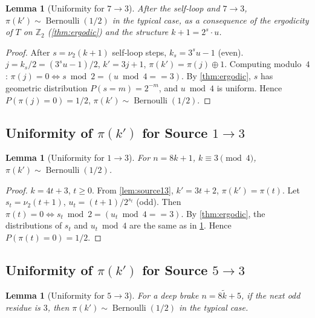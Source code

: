 \documentclass[12pt,a4paper]{article}
\newtheorem{lemma}[theorem]{Lemma}
\theoremstyle{definition}
\theoremstyle{remark}
\begin{document}
\begin{lemma}[Uniformity for $7\to3$]\label{lem:unif73}
After the self‑loop and $7\to3$, $\pi(k')\sim\operatorname{Bernoulli}(1/2)$
in the typical case, as a consequence of the ergodicity of $T$ on
$\mathbb Z_2$ (\cref{thm:ergodic}) and the structure
$k+1=2^s\!\cdot u$.
\end{lemma}

\begin{proof}
After $s=\nu_2(k+1)$ self‑loop steps, $k_s=3^su-1$ (even).
$j=k_s/2=(3^su-1)/2$, $k'=3j+1$, $\pi(k')=\pi(j)\oplus1$.
Computing modulo~$4$:
$\pi(j)=0\iff s\bmod2=(u\bmod4==3)$.
By \cref{thm:ergodic}, $s$ has geometric distribution
$P(s=m)=2^{-m}$, and $u\bmod4$ is uniform.
Hence $P(\pi(j)=0)=1/2$, $\pi(k')\sim\operatorname{Bernoulli}(1/2)$.
\end{proof}

\subsection{Uniformity of $\pi(k')$ for Source $1\to3$}

\begin{lemma}[Uniformity for $1\to3$]\label{lem:unif13}
For $n=8k+1$, $k\equiv3\pmod4$, $\pi(k')\sim\operatorname{Bernoulli}(1/2)$.
\end{lemma}

\begin{proof}
$k=4t+3$, $t\ge0$. From \cref{lem:source13}, $k'=3t+2$,
$\pi(k')=\pi(t)$.
Let $s_t=\nu_2(t+1)$, $u_t=(t+1)/2^{s_t}$ (odd).
Then $\pi(t)=0\iff s_t\bmod2=(u_t\bmod4==3)$.
By \cref{thm:ergodic}, the distributions of $s_t$ and $u_t\bmod4$ are
the same as in \cref{lem:unif73}.
Hence $P(\pi(t)=0)=1/2$.
\end{proof}

\subsection{Uniformity of $\pi(k')$ for Source $5\to3$}

\begin{lemma}[Uniformity for $5\to3$]\label{lem:unif53}
For a deep brake $n=8\tilde k+5$, if the next odd residue is $3$, then
$\pi(k')\sim\operatorname{Bernoulli}(1/2)$ in the typical case.
\end{lemma}
\end{document}
